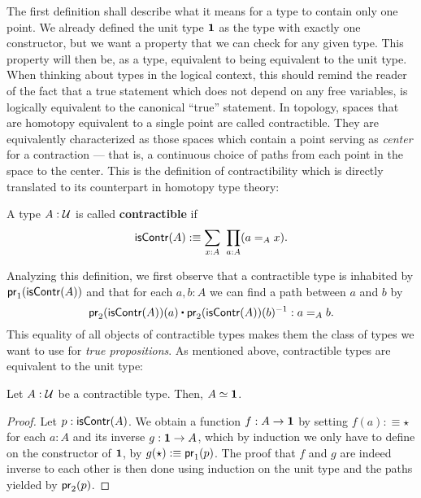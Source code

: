 The first definition shall describe what it means for a type to contain only one
point.
We already defined the unit type $\mathbf{1}$ as the type with exactly one constructor,
but we want a property that we can check for any given type.
This property will then be, as a type, equivalent to being equivalent to the unit
type.
When thinking about types in the logical context, this should remind the reader
of the fact that a true statement which does not depend on any free variables,
is logically equivalent to the canonical ``true'' statement.
In topology, spaces that are homotopy equivalent to a single point are called
contractible.
They are equivalently characterized as those spaces which contain a point serving
as \emph{center} for a contraction --- that is, a continuous choice of paths from each
point in the space to the center.
This is the definition of contractibility which is directly translated to
its counterpart in homotopy type theory:
\begin{defn}[Contractibility]
A type $A : \mathcal{U}$ is called \textbf{contractible} if
\begin{equation*}
\mathsf{isContr}(A) :\equiv \sum_{x : A} ~ \prod_{a : A} (a =_A x) \text{.}
\end{equation*}
\end{defn}

Analyzing this definition, we first observe that a contractible type is inhabited
by $\mathsf{pr}_1(\mathsf{isContr}(A))$ and that for each $a, b : A$ we can find a path between
$a$ and $b$ by
\begin{equation*}
\pr_2(\isContr(A))(a) \ct \pr_2(\isContr(A))(b)\inv : a =_A b \text{.}
\end{equation*}
This equality of all objects of contractible types makes them the class of types
we want to use for \emph{true propositions}.
As mentioned above, contractible types are equivalent to the unit type:

\begin{lemma}
Let $A : \mathcal{U}$ be a contractible type. Then, $A \simeq \mathbf{1}$.
\end{lemma}

\begin{proof}
Let $p : \mathsf{isContr}(A)$.
We obtain a function $f : A \to \mathbf{1}$ by setting $f(a) :\equiv \star$ for each
$a : A$ and its inverse $g : \mathbf{1} \to A$, which by induction we only have to
define on the constructor of $\mathbf{1}$, by $g(\star) :\equiv \mathsf{pr}_1(p)$.
The proof that $f$ and $g$ are indeed inverse to each other is then done
using induction on the unit type and the paths yielded by $\mathsf{pr}_2(p)$.
\end{proof}

